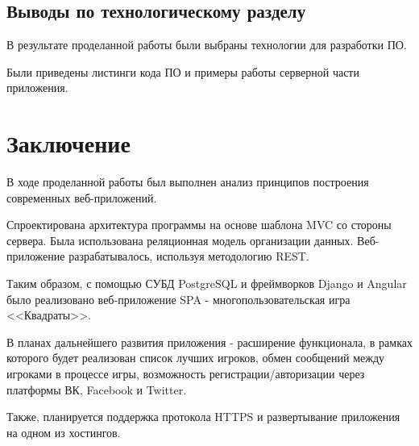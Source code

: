 \documentclass[a4paper,14pt]{extarticle}
\begin{document}
 	\subsection*{Выводы по технологическому разделу}
 	
 	В результате проделанной работы были выбраны технологии для разработки ПО.
 	
 	Были приведены листинги кода ПО и примеры работы серверной части приложения.
 	
 	\newpage
 	\section*{Заключение}
 	
 	В ходе проделанной работы был выполнен анализ принципов построения современных веб-приложений.
 	
 	Спроектирована архитектура программы на основе шаблона MVC со стороны сервера. Была использована реляционная модель организации данных. Веб-приложение разрабатывалось, используя методологию REST.

 	Таким образом, с помощью СУБД PostgreSQL и фреймворков Django и Angular было реализовано веб-приложение SPA - многопользовательская игра <<Квадраты>>.
 	
 	В планах дальнейшего развития приложения - расширение функционала, в рамках которого будет реализован список лучших игроков, обмен сообщений между игроками в процессе игры, возможность регистрации/авторизации через платформы ВК, Facebook и Twitter.
 	
 	Также, планируется поддержка протокола HTTPS и развертывание приложения на одном из хостингов.
 	
 	\newpage
 	
\end{document}
